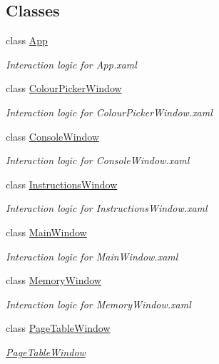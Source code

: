 \subsection*{Classes}
\begin{DoxyCompactItemize}
\item 
class \hyperlink{class_c_p_u___o_s___simulator_1_1_app}{App}
\begin{DoxyCompactList}\small\item\em Interaction logic for App.\+xaml \end{DoxyCompactList}\item 
class \hyperlink{class_c_p_u___o_s___simulator_1_1_colour_picker_window}{Colour\+Picker\+Window}
\begin{DoxyCompactList}\small\item\em Interaction logic for Colour\+Picker\+Window.\+xaml \end{DoxyCompactList}\item 
class \hyperlink{class_c_p_u___o_s___simulator_1_1_console_window}{Console\+Window}
\begin{DoxyCompactList}\small\item\em Interaction logic for Console\+Window.\+xaml \end{DoxyCompactList}\item 
class \hyperlink{class_c_p_u___o_s___simulator_1_1_instructions_window}{Instructions\+Window}
\begin{DoxyCompactList}\small\item\em Interaction logic for Instructions\+Window.\+xaml \end{DoxyCompactList}\item 
class \hyperlink{class_c_p_u___o_s___simulator_1_1_main_window}{Main\+Window}
\begin{DoxyCompactList}\small\item\em Interaction logic for Main\+Window.\+xaml \end{DoxyCompactList}\item 
class \hyperlink{class_c_p_u___o_s___simulator_1_1_memory_window}{Memory\+Window}
\begin{DoxyCompactList}\small\item\em Interaction logic for Memory\+Window.\+xaml \end{DoxyCompactList}\item 
class \hyperlink{class_c_p_u___o_s___simulator_1_1_page_table_window}{Page\+Table\+Window}
\begin{DoxyCompactList}\small\item\em \hyperlink{class_c_p_u___o_s___simulator_1_1_page_table_window}{Page\+Table\+Window} \end{DoxyCompactList}\end{DoxyCompactItemize}
